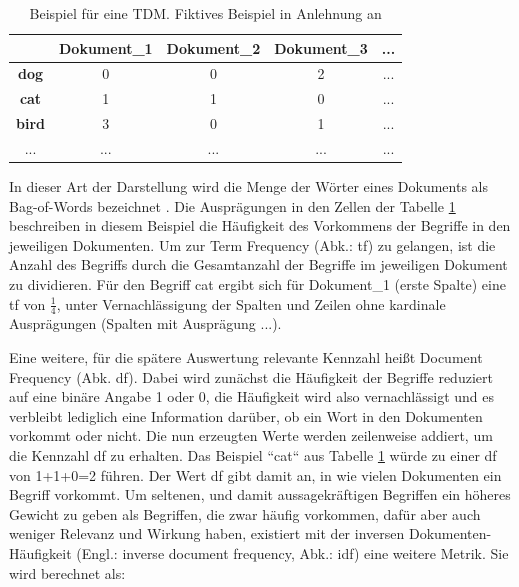 \begin{table}[h]
\centering
\begin{tabular}{|c|c|c|c|c|}
\hline
\textbf{}     & \textbf{Dokument\_1} & \textbf{Dokument\_2} & \textbf{Dokument\_3} & \textbf{...} \\ \hline
\textbf{dog}  & 0                    & 0                    & 2                    & ...          \\ \hline
\textbf{cat}  & 1                    & 1                    & 0                    & ...          \\ \hline
\textbf{bird} & 3                    & 0                    & 1                    & ...          \\ \hline
...           & ...                  & ...                  & ...                  & ...          \\ \hline
\end{tabular}
\caption{Beispiel für eine TDM. Fiktives Beispiel in Anlehnung an \cite[S. 62]{Anandarajan}}
\label{tab:tdm}
\end{table}

In dieser Art der Darstellung wird die Menge der Wörter eines Dokuments als Bag-of-Words bezeichnet \cite[S. 46]{Anandarajan}. Die Ausprägungen in den Zellen der Tabelle \ref{tab:tdm} beschreiben in diesem Beispiel die Häufigkeit des Vorkommens der Begriffe in den jeweiligen Dokumenten. Um zur Term Frequency (Abk.: tf) zu gelangen, ist die Anzahl des Begriffs durch die Gesamtanzahl der Begriffe im jeweiligen Dokument zu dividieren. Für den Begriff cat ergibt sich für Dokument\_1 (erste Spalte) eine tf von \( \frac{1}{4} \), unter Vernachlässigung der Spalten und Zeilen ohne kardinale Ausprägungen (Spalten mit Ausprägung ...).

Eine weitere, für die spätere Auswertung relevante Kennzahl heißt Document Frequency (Abk. df). Dabei wird zunächst die Häufigkeit der Begriffe reduziert auf eine binäre Angabe 1 oder 0, die Häufigkeit wird also vernachlässigt und es verbleibt lediglich eine Information darüber, ob ein Wort in den Dokumenten vorkommt oder nicht. Die nun erzeugten Werte werden zeilenweise addiert, um die Kennzahl df zu erhalten. Das Beispiel ``cat`` aus Tabelle \ref{tab:tdm} würde zu einer df von 1+1+0=2 führen. Der Wert df gibt damit an, in wie vielen Dokumenten ein Begriff vorkommt. Um seltenen, und damit aussagekräftigen Begriffen ein höheres Gewicht zu geben als Begriffen, die zwar häufig vorkommen, dafür aber auch weniger Relevanz und Wirkung haben, existiert mit der inversen Dokumenten-Häufigkeit (Engl.: inverse document frequency, Abk.: idf) eine weitere Metrik. Sie wird berechnet als:

